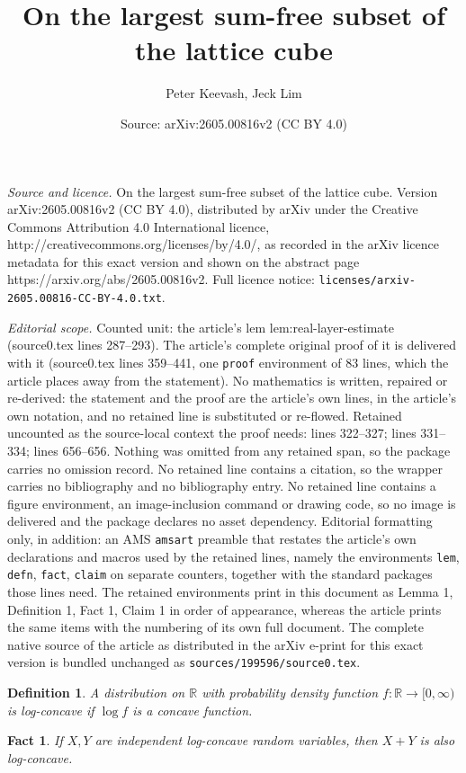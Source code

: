 \documentclass[10pt,a4paper]{amsart}
\title{On the largest sum-free subset of the lattice cube}
\author{Peter Keevash, Jeck Lim}
\date{Source: arXiv:2605.00816v2 (CC BY 4.0)}
\newtheorem{defn}{Definition}
\newtheorem{fact}{Fact}
\newcommand{\RR}{\mathbb{R}}
\begin{document}
\maketitle

\noindent\emph{Source and licence.} On the largest sum-free subset of the lattice cube. Version arXiv:2605.00816v2 (CC BY 4.0), distributed by arXiv under the Creative Commons Attribution 4.0 International licence, http://creativecommons.org/licenses/by/4.0/, as recorded in the arXiv licence metadata for this exact version and shown on the abstract page https://arxiv.org/abs/2605.00816v2. Full licence notice: \texttt{licenses/arxiv-2605.00816-CC-BY-4.0.txt}.\par\smallskip

\noindent\textit{Editorial scope.} Counted unit: the article's lem lem:real-layer-estimate (source0.tex lines 287--293). The article's complete original proof of it is delivered with it (source0.tex lines 359--441, one \texttt{proof} environment of 83 lines, which the article places away from the statement). No mathematics is written, repaired or re-derived: the statement and the proof are the article's own lines, in the article's own notation, and no retained line is substituted or re-flowed.  Retained uncounted as the source-local context the proof needs: lines 322--327; lines 331--334; lines 656--656.  Nothing was omitted from any retained span, so the package carries no omission record.  No retained line contains a citation, so the wrapper carries no bibliography and no bibliography entry.  No retained line contains a figure environment, an image-inclusion command or drawing code, so no image is delivered and the package declares no asset dependency.  Editorial formatting only, in addition: an AMS \texttt{amsart} preamble that restates the article's own declarations and macros used by the retained lines, namely the environments \texttt{lem}, \texttt{defn}, \texttt{fact}, \texttt{claim} on separate counters, together with the standard packages those lines need.  The retained environments print in this document as Lemma 1, Definition 1, Fact 1, Claim 1 in order of appearance, whereas the article prints the same items with the numbering of its own full document.  The complete native source of the article as distributed in the arXiv e-print for this exact version is bundled unchanged as \texttt{sources/199596/source0.tex}.
\begin{defn}
    A distribution on $\RR$ with probability density function $f:\RR\to [0,\infty)$ is \emph{log-concave} if $\log f$ is a concave function.
\end{defn}
\begin{fact} \label{fact:log-concave-add}
    If $X,Y$ are independent log-concave random variables, then $X+Y$ is also log-concave.
\end{fact}
\end{document}
